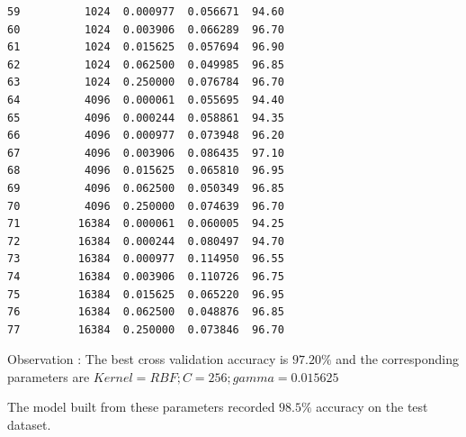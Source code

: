 \documentclass[letterpaper,doc,notimes]{apa6}
\begin{document}
\begin{verbatim}
59          1024  0.000977  0.056671  94.60
60          1024  0.003906  0.066289  96.70
61          1024  0.015625  0.057694  96.90
62          1024  0.062500  0.049985  96.85
63          1024  0.250000  0.076784  96.70
64          4096  0.000061  0.055695  94.40
65          4096  0.000244  0.058861  94.35
66          4096  0.000977  0.073948  96.20
67          4096  0.003906  0.086435  97.10
68          4096  0.015625  0.065810  96.95
69          4096  0.062500  0.050349  96.85
70          4096  0.250000  0.074639  96.70
71         16384  0.000061  0.060005  94.25
72         16384  0.000244  0.080497  94.70
73         16384  0.000977  0.114950  96.55
74         16384  0.003906  0.110726  96.75
75         16384  0.015625  0.065220  96.95
76         16384  0.062500  0.048876  96.85
77         16384  0.250000  0.073846  96.70

\end{verbatim}

Observation :
The best cross validation accuracy is $97.20\% $ and the corresponding parameters are $Kernel= RBF; C=256; gamma=0.015625$

The model built from these parameters recorded $98.5\%$ accuracy on the test dataset.
\end{document}

